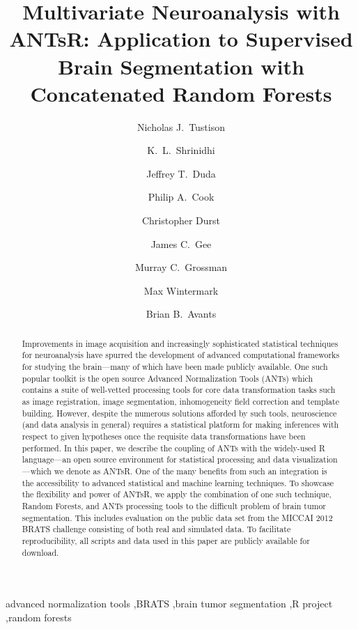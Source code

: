 \documentclass[final,5p,times,twocolumn]{elsarticle}
\begin{document}
\begin{frontmatter}

\title{Multivariate Neuroanalysis with ANTsR:  Application to Supervised Brain Segmentation with Concatenated Random Forests}

\author[label1]{Nicholas J.~Tustison
  }
\author[label2]{K.~L.~Shrinidhi}
\author[label2]{Jeffrey T.~Duda}
\author[label2]{Philip A.~Cook}
\author[label1]{Christopher Durst}
\author[label1]{James C.~Gee}
\author[label1]{Murray C.~Grossman}
\author[label1]{Max Wintermark}
\author[label2]{Brian B.~Avants}
\address[label1]{Department of Radiology and Medical Imaging, University of Virginia, Charlottesville, VA}
\address[label2]{Penn Image Computing and Science Laboratory, University of Pennsylvania,
                Philadelphia, PA}


\linenumbers

\begin{abstract} 
Improvements in image acquisition and increasingly sophisticated statistical techniques 
for neuroanalysis have spurred the development of advanced computational frameworks for studying the
brain---many of which
have been made publicly available.  One such popular toolkit is the open source Advanced
Normalization Tools (ANTs) which contains a suite of well-vetted processing tools for
core data transformation tasks such as image registration, image segmentation, 
inhomogeneity field correction and template building.  However, despite the numerous
solutions afforded by such tools, neuroscience (and data analysis in general) requires
a statistical platform for making inferences with respect to given hypotheses once the 
requisite data transformations have been performed.  In this paper, we describe the
coupling of ANTs with the widely-used R language---an open source environment for 
statistical processing and data visualization---which we denote as ANTsR.  One of the
many benefits from such an integration is the accessibility to advanced statistical 
and machine learning techniques.  To showcase the flexibility and power of ANTsR, we 
apply the combination of one such technique, Random Forests, and ANTs processing 
tools to the difficult problem of brain tumor segmentation.  This includes evaluation on 
the public data set from the MICCAI 2012 BRATS challenge consisting of both real and simulated
data.  To facilitate reproducibility, all scripts and data used in this paper are 
publicly available for download.  
\end{abstract}

\begin{keyword}
advanced normalization tools \sep BRATS \sep brain tumor segmentation \sep R project \sep random forests
\end{keyword}

\end{frontmatter}
%
%
\newpage
\end{document}
